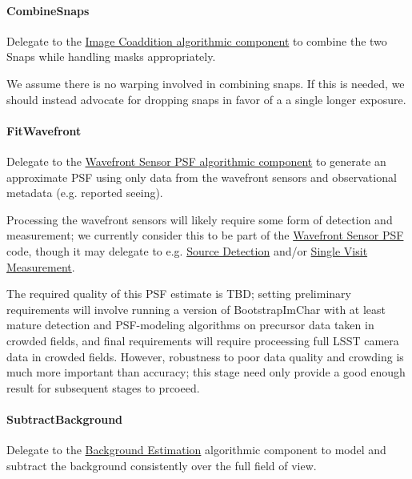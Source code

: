 \paragraph{CombineSnaps}
\label{sec:drpBootstrapImChar_CombineSnaps}

Delegate to the \hyperref[sec:acCoaddition]{Image Coaddition algorithmic component} to combine the two Snaps while handling masks appropriately.

We assume there is no warping involved in combining snaps.  If this is needed, we should instead advocate for dropping snaps in favor of a a single longer exposure.

\paragraph{FitWavefront}
\label{sec:drpBootstrapImChar_FitWavefront}

Delegate to the \hyperref[sec:acWavefrontSensorPSF]{Wavefront Sensor PSF algorithmic component} to generate an approximate PSF using only data from the wavefront sensors and observational metadata (e.g. reported seeing).

Processing the wavefront sensors will likely require some form of detection and measurement; we currently consider this to be part of the \hyperref[sec:acWavefrontSensorPSF]{Wavefront Sensor PSF} code, though it may delegate to e.g. \hyperref[sec:acSourceDetection]{Source Detection} and/or \hyperref[sec:acSingleVisitMeasurement]{Single Visit Measurement}.

The required quality of this PSF estimate is TBD; setting preliminary requirements will involve running a version of BootstrapImChar with at least mature detection and PSF-modeling algorithms on precursor data taken in crowded fields, and final requirements will require proceessing full LSST camera data in crowded fields.  However, robustness to poor data quality and crowding is much more important than accuracy; this stage need only provide a good enough result for subsequent stages to prcoeed.

\paragraph{SubtractBackground}
\label{sec:drpBootstrapImChar_SubtractBackground}

Delegate to the \hyperref[sec:acBackgroundEstimation]{Background Estimation} algorithmic component to model and subtract the background consistently over the full field of view.

